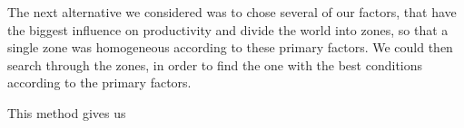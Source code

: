 
The next alternative we considered was to chose several of our factors, that have the biggest influence on productivity and divide the world into zones, so that a single zone was homogeneous according to these primary factors. We could then search through the zones, in order to find the one with the best conditions according to the primary factors. 

This method gives us 